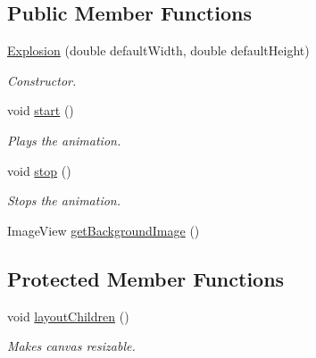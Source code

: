 \subsection*{Public Member Functions}
\begin{DoxyCompactItemize}
\item 
\hyperlink{classbattleship2D_1_1ui_1_1Explosion_af483832a0d9787c903d9aff653954892}{Explosion} (double default\-Width, double default\-Height)
\begin{DoxyCompactList}\small\item\em Constructor. \end{DoxyCompactList}\item 
void \hyperlink{classbattleship2D_1_1ui_1_1Explosion_a0831b223d28d71af3045fe25e9dcfe76}{start} ()
\begin{DoxyCompactList}\small\item\em Plays the animation. \end{DoxyCompactList}\item 
void \hyperlink{classbattleship2D_1_1ui_1_1Explosion_aa858a4539a0f76f0e96ddad158179740}{stop} ()
\begin{DoxyCompactList}\small\item\em Stops the animation. \end{DoxyCompactList}\item 
Image\-View \hyperlink{classbattleship2D_1_1ui_1_1Explosion_a6f0bf18b4f52837666495a3dd81b3ca2}{get\-Background\-Image} ()
\end{DoxyCompactItemize}
\subsection*{Protected Member Functions}
\begin{DoxyCompactItemize}
\item 
void \hyperlink{classbattleship2D_1_1ui_1_1Explosion_a61dba5f9eb620647547fe4eff0a53210}{layout\-Children} ()
\begin{DoxyCompactList}\small\item\em Makes canvas resizable. \end{DoxyCompactList}\end{DoxyCompactItemize}
